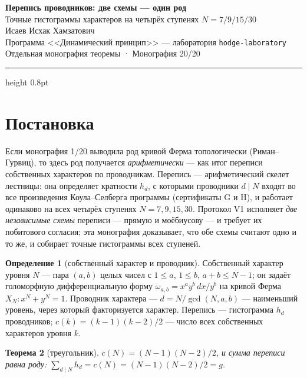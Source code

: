 \documentclass[11pt,a4paper]{article}
\theoremstyle{plain}
\newtheorem{theorem}{Теорема}
\theoremstyle{definition}
\newtheorem{definition}[theorem]{Определение}
\theoremstyle{remark}
\begin{document}
\begin{center}
{\LARGE\bfseries Перепись проводников: две схемы --- один род}\\[0.4em]
{\large Точные гистограммы характеров на четырёх ступенях $N=7/9/15/30$}\\[0.6em]
{\normalsize Исаев Исхак Хамзатович}\\[0.2em]
{\small Программа <<Динамический принцип>> --- лаборатория \texttt{hodge-laboratory}}\\[0.15em]
{\small Отдельная монография теоремы · Монография 20/20}
\end{center}
\vspace{0.4em}
{\color{linkblue}\hrule height 0.8pt}
\vspace{0.8em}

\section{Постановка}

Если монография 1/20 выводила род кривой Ферма топологически
(Риман--Гурвиц), то здесь род получается \emph{арифметически} ---
как итог переписи собственных характеров по проводникам.
Перепись --- арифметический скелет лестницы: она определяет
кратности $h_d$, с которыми проводники $d\mid N$ входят во все
произведения Коула--Селберга программы (сертификаты G и H), и
работает одинаково на всех четырёх ступенях $N=7,9,15,30$.
Протокол V1 исполняет \emph{две независимые схемы} переписи ---
прямую и моёбиусову --- и требует их побитового согласия; эта
монография доказывает, что обе схемы считают одно и то же, и
собирает точные гистограммы всех ступеней.

\begin{definition}[собственный характер и проводник]\label{th:def}
Собственный характер уровня $N$ --- пара $(a,b)$ целых чисел с
$1\le a$, $1\le b$, $a+b\le N-1$; он задаёт голоморфную дифференциальную
форму $\omega_{a,b}=x^ay^b\,dx/y^b$ на кривой Ферма
$X_N\colon x^N+y^N=1$. Проводник характера ---
$d=N/\gcd(N,a,b)$ --- наименьший уровень, через который факторизуется
характер. Перепись --- гистограмма $h_d$ проводников;
$c(k)=(k-1)(k-2)/2$ --- число всех собственных характеров
уровня $k$.
\end{definition}

\begin{theorem}[треугольник]\label{th:tri}
$c(N)=(N-1)(N-2)/2$, и сумма переписи равна роду:
$\sum_{d\mid N}h_d=c(N)=(N-1)(N-2)/2=g$.
\end{theorem}
\end{document}
